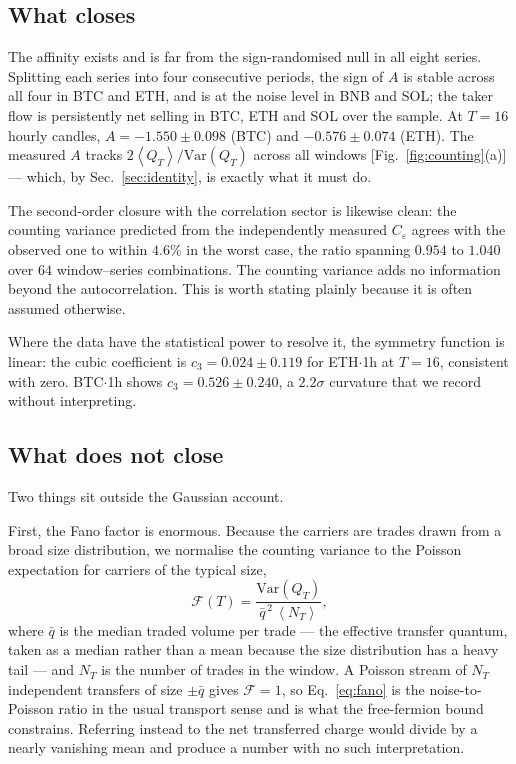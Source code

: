 \documentclass[aps,pre,twocolumn,superscriptaddress,floatfix,nofootinbib]{revtex4-2}
\newcommand{\eps}{\varepsilon}
\newcommand{\avg}[1]{\left\langle #1 \right\rangle}
\newcommand{\Var}{\mathrm{Var}}
\begin{document}
\subsection{What closes}

The affinity exists and is far from the sign-randomised null in all eight
series. Splitting each series into four consecutive periods, the sign of $A$ is
stable across all four in BTC and ETH, and is at the noise level in BNB and
SOL; the taker flow is persistently net selling in BTC, ETH and SOL over the
sample. At $T=16$ hourly candles, $A = -1.550\pm0.098$ (BTC) and
$-0.576\pm0.074$ (ETH). The measured $A$ tracks $2\avg{Q_T}/\Var(Q_T)$ across
all windows [Fig.~\ref{fig:counting}(a)] --- which, by Sec.~\ref{sec:identity},
is exactly what it must do.

The second-order closure with the correlation sector is likewise clean: the
counting variance predicted from the independently measured $C_\eps$ agrees with
the observed one to within $4.6\%$ in the worst case, the ratio spanning
$0.954$ to $1.040$ over $64$ window--series combinations. The counting variance
adds no information beyond the autocorrelation. This is worth stating plainly
because it is often assumed otherwise.

Where the data have the statistical power to resolve it, the symmetry function
is linear: the cubic coefficient is $c_3 = 0.024\pm0.119$ for ETH$\cdot$1h at
$T=16$, consistent with zero. BTC$\cdot$1h shows $c_3 = 0.526\pm0.240$, a
$2.2\sigma$ curvature that we record without interpreting.

\subsection{What does not close}

Two things sit outside the Gaussian account.

First, the Fano factor is enormous. Because the carriers are trades drawn from
a broad size distribution, we normalise the counting variance to the Poisson
expectation for carriers of the typical size,
\begin{equation}
  \mathcal{F}(T)=\frac{\Var(Q_T)}{\bar q^{\,2}\,\avg{N_T}} ,
  \label{eq:fano}
\end{equation}
where $\bar q$ is the median traded volume per trade --- the effective transfer
quantum, taken as a median rather than a mean because the size distribution has
a heavy tail --- and $N_T$ is the number of trades in the window. A Poisson
stream of $N_T$ independent transfers of size $\pm\bar q$ gives
$\mathcal{F}=1$, so Eq.~\eqref{eq:fano} is the noise-to-Poisson ratio in the
usual transport sense and is what the free-fermion bound constrains. Referring
instead to the net transferred charge would divide by a nearly vanishing mean
and produce a number with no such interpretation.
\end{document}
